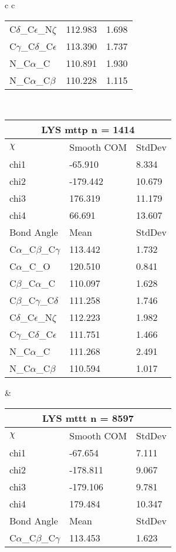 \begin{longtable}{ c c }
\begin{tabular}{ l l l }
  C$\delta$\_C$\epsilon$\_N$\zeta$ & 112.983 & 1.698\\
  C$\gamma$\_C$\delta$\_C$\epsilon$ & 113.390 & 1.737\\
  N\_C$\alpha$\_C & 110.891 & 1.930\\
  N\_C$\alpha$\_C$\beta$ & 110.228 & 1.115\\
  \bottomrule
  \end{tabular}
  \\
  \begin{tabular}{ l l l }
  \toprule
  \multicolumn{3}{c}{LYS \textbf{mttp} n = 1414} \\ \toprule
  $\chi$       & Smooth COM & StdDev \\ \midrule
  chi1 & -65.910 & 8.334 \\ 
  chi2 & -179.442 & 10.679 \\ 
  chi3 & 176.319 & 11.179 \\ 
  chi4 & 66.691 & 13.607 \\ \midrule
  Bond Angle   & Mean     & StdDev \\ \midrule
  C$\alpha$\_C$\beta$\_C$\gamma$ & 113.442 & 1.732\\
  C$\alpha$\_C\_O & 120.510 & 0.841\\
  C$\beta$\_C$\alpha$\_C & 110.097 & 1.628\\
  C$\beta$\_C$\gamma$\_C$\delta$ & 111.258 & 1.746\\
  C$\delta$\_C$\epsilon$\_N$\zeta$ & 112.223 & 1.982\\
  C$\gamma$\_C$\delta$\_C$\epsilon$ & 111.751 & 1.466\\
  N\_C$\alpha$\_C & 111.268 & 2.491\\
  N\_C$\alpha$\_C$\beta$ & 110.594 & 1.017\\
  \bottomrule
  \end{tabular}
  &
  \begin{tabular}{ l l l }
  \toprule
  \multicolumn{3}{c}{LYS \textbf{mttt} n = 8597} \\ \toprule
  $\chi$       & Smooth COM & StdDev \\ \midrule
  chi1 & -67.654 & 7.111 \\ 
  chi2 & -178.811 & 9.067 \\ 
  chi3 & -179.106 & 9.781 \\ 
  chi4 & 179.484 & 10.347 \\ \midrule
  Bond Angle   & Mean     & StdDev \\ \midrule
  C$\alpha$\_C$\beta$\_C$\gamma$ & 113.453 & 1.623\\

\end{tabular}
\end{longtable}
